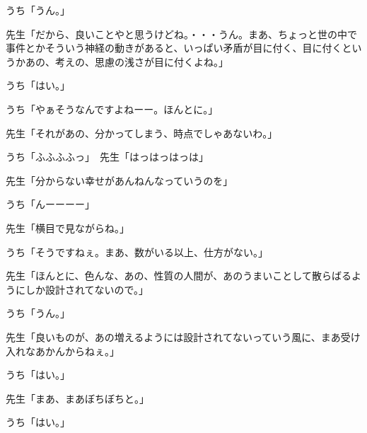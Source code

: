 \documentclass[b5j,twoside,twocolumn]{utarticle}
\begin{document}
\begin{description}
\item うち「うん。」
\item 先生「だから、良いことやと思うけどね。・・・うん。まあ、ちょっと世の中で事件とかそういう神経の動きがあると、いっぱい矛盾が目に付く、目に付くというかあの、考えの、思慮の浅さが目に付くよね。」
\item うち「はい。」
\item うち「やぁそうなんですよねーー。ほんとに。」
\item 先生「それがあの、分かってしまう、時点でしゃあないわ。」
\item うち「ふふふふっ」　先生「はっはっはっは」
\item 先生「分からない幸せがあんねんなっていうのを」
\item うち「んーーーー」
\item 先生「横目で見ながらね。」
\item うち「そうですねぇ。まあ、数がいる以上、仕方がない。」
\item 先生「ほんとに、色んな、あの、性質の人間が、あのうまいことして散らばるようにしか設計されてないので。」
\item うち「うん。」
\item 先生「良いものが、あの増えるようには設計されてないっていう風に、まあ受け入れなあかんからねぇ。」
\item うち「はい。」
\item 先生「まあ、まあぼちぼちと。」
\item うち「はい。」
\end{description}
\end{document}
